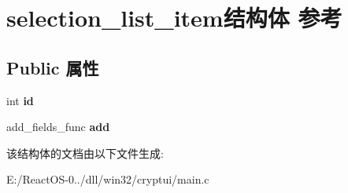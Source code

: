 \hypertarget{structselection__list__item}{}\section{selection\+\_\+list\+\_\+item结构体 参考}
\label{structselection__list__item}
\subsection*{Public 属性}
\begin{DoxyCompactItemize}
\item 
\mbox{\label{structselection__list__item_a2b34c657563aac293e44dcd4c7a80902}} 
int {\bfseries id}
\item 
\mbox{\label{structselection__list__item_a4b50549b22ac109445bb83dab596a564}} 
add\+\_\+fields\+\_\+func {\bfseries add}
\end{DoxyCompactItemize}


该结构体的文档由以下文件生成\+:\begin{DoxyCompactItemize}
\item 
E\+:/\+React\+O\+S-\/0../dll/win32/cryptui/main.\+c\end{DoxyCompactItemize}
